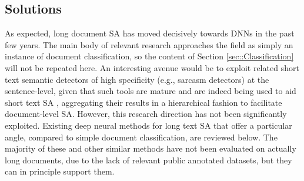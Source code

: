 \documentclass[preprint,review,10pt]{elsarticle}
\begin{document}
	\subsection{Solutions}
	As expected, long document SA has moved decisively towards DNNs in the past few years. The main body of relevant research approaches the field as simply an instance of document classification, so the content of Section \ref{sec::Classification} will not be repeated here. An interesting avenue would be to exploit related short text semantic detectors of high specificity (e.g., sarcasm detectors) at the sentence-level, given that such tools are mature \cite{dmitry} \cite{shelly} and are indeed being used to aid short text SA \cite{Karamouzas2022}, aggregating their results in a hierarchical fashion to facilitate document-level SA. However, this research direction has not been significantly exploited. Existing deep neural methods for long text SA that offer a particular angle, compared to simple document classification, are reviewed below. The majority of these and other similar methods have not been evaluated on actually long documents, due to the lack of relevant public annotated datasets, but they can in principle support them.
	
\end{document}
